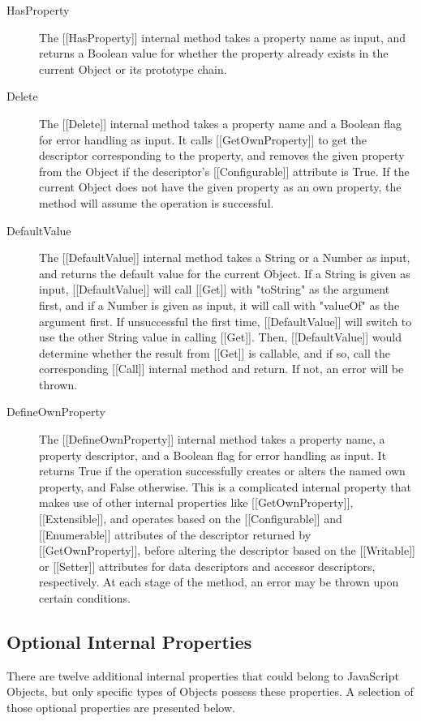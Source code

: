 \documentclass[a4paper,11pt,twoside]{report}
\begin{document}
\begin{description}
\item[HasProperty] The [[HasProperty]] internal method takes a property name as input, and returns a Boolean value for whether the property already exists in the current Object or its prototype chain.

\item[Delete] The [[Delete]] internal method takes a property name and a Boolean flag for error handling as input. It calls [[GetOwnProperty]] to get the descriptor corresponding to the property, and removes the given property from the Object if the descriptor's [[Configurable]] attribute is True. If the current Object does not have the given property as an own property, the method will assume the operation is successful.

\item[DefaultValue] The [[DefaultValue]] internal method takes a String or a Number as input, and returns the default value for the current Object. If a String is given as input, [[DefaultValue]] will call [[Get]] with "toString" as the argument first, and if a Number is given as input, it will call with "valueOf" as the argument first. If unsuccessful the first time, [[DefaultValue]] will switch to use the other String value in calling [[Get]]. Then, [[DefaultValue]] would determine whether the result from [[Get]] is callable, and if so, call the corresponding [[Call]] internal method and return. If not, an error will be thrown.

\item[DefineOwnProperty] The [[DefineOwnProperty]] internal method takes a property name, a property descriptor, and a Boolean flag for error handling as input. It returns True if the operation successfully creates or alters the named own property, and False otherwise. This is a complicated internal property that makes use of other internal properties like [[GetOwnProperty]], [[Extensible]], and operates based on the [[Configurable]] and [[Enumerable]] attributes of the descriptor returned by [[GetOwnProperty]], before altering the descriptor based on the [[Writable]] or [[Setter]] attributes for data descriptors and accessor descriptors, respectively. At each stage of the method, an error may be thrown upon certain conditions.
\end{description}

\subsection{Optional Internal Properties}\label{sec:opip}
There are twelve additional internal properties that could belong to JavaScript Objects, but only specific types of Objects possess these properties. A selection of those optional properties are presented below.
\end{document}
